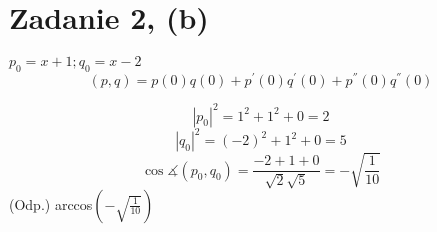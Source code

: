 \documentclass{article}
\begin{document}
\section{Zadanie 2, (b)}
$p_0 = x+1; q_0 = x-2$ \newline
$$(p,q)=p(0)q(0)+p^{'}(0)q^{'}(0)+p^{''}(0)q^{''}(0)$$

$$|p_0|^2 = 1^2 +1^2 + 0 = 2$$
$$|q_0|^2 = (-2)^2 + 1^2 + 0 = 5$$
$$\cos \measuredangle(p_0 ,q_0) = \frac{-2+1+0}{\sqrt{2} \sqrt{5}} = -\sqrt{\frac{1}{10}}$$
(Odp.) arccos$(-\sqrt{\frac{1}{10}})$
\end{document}

